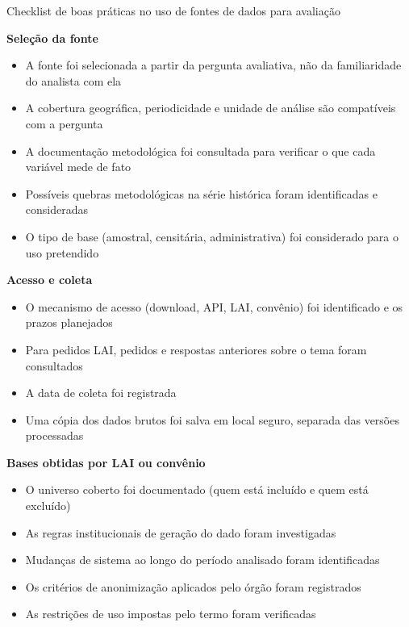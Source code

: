 \begin{boxdestaque}{Checklist de boas práticas no uso de fontes de dados para avaliação}

\textbf{Seleção da fonte}
\begin{itemize}
  \item[$\square$] A fonte foi selecionada a partir da pergunta avaliativa, não da familiaridade do analista com ela
  \item[$\square$] A cobertura geográfica, periodicidade e unidade de análise são compatíveis com a pergunta
  \item[$\square$] A documentação metodológica foi consultada para verificar o que cada variável mede de fato
  \item[$\square$] Possíveis quebras metodológicas na série histórica foram identificadas e consideradas
  \item[$\square$] O tipo de base (amostral, censitária, administrativa) foi considerado para o uso pretendido
\end{itemize}

\textbf{Acesso e coleta}
\begin{itemize}
  \item[$\square$] O mecanismo de acesso (download, API, LAI, convênio) foi identificado e os prazos planejados
  \item[$\square$] Para pedidos LAI, pedidos e respostas anteriores sobre o tema foram consultados
  \item[$\square$] A data de coleta foi registrada
  \item[$\square$] Uma cópia dos dados brutos foi salva em local seguro, separada das versões processadas
\end{itemize}

\textbf{Bases obtidas por LAI ou convênio}
\begin{itemize}
  \item[$\square$] O universo coberto foi documentado (quem está incluído e quem está excluído)
  \item[$\square$] As regras institucionais de geração do dado foram investigadas
  \item[$\square$] Mudanças de sistema ao longo do período analisado foram identificadas
  \item[$\square$] Os critérios de anonimização aplicados pelo órgão foram registrados
  \item[$\square$] As restrições de uso impostas pelo termo foram verificadas
\end{itemize}


\end{boxdestaque}
